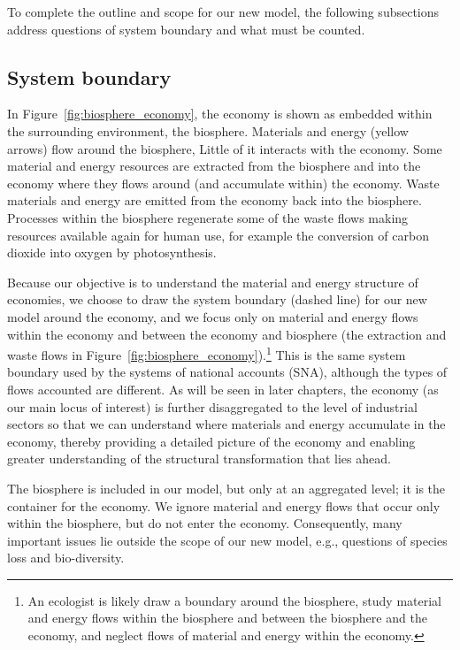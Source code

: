 To complete the outline and scope for our new model, 
the following subsections address
questions of system boundary and what must be counted.


\subsection{System boundary}
\label{sec:system_boundary}

In Figure~\ref{fig:biosphere_economy},
the economy is shown as embedded within the surrounding environment,
the biosphere.
Materials and energy (yellow arrows) flow around the biosphere,
Little of it interacts with the economy.
Some material and energy resources are extracted from the biosphere 
and into the economy where they 
flows around (and accumulate within) the economy.
Waste materials and energy are emitted from the economy back into the biosphere.
Processes within the biosphere regenerate some of the waste
flows making resources available again for human use,
for example the conversion of carbon dioxide into oxygen by photosynthesis.

Because our objective is to understand the material and energy structure of economies,
we choose to draw the system boundary (dashed line) for our new model 
around the economy, 
and we focus only on material and energy flows within the economy
and between the economy and biosphere (the extraction and waste flows 
in Figure~\ref{fig:biosphere_economy}).\footnote{An ecologist
	is likely draw a boundary around the biosphere, 
	study material and energy flows within the biosphere
	and between the biosphere and the economy, and 
	neglect flows of material and energy within the economy.
	}
This is the same system boundary used by the
systems of national accounts (SNA),
although the types of flows accounted are different.
As will be seen in later chapters,
the economy (as our main locus of interest) is further disaggregated 
to the level of industrial sectors
so that we can understand 
where materials and energy accumulate in the economy, thereby providing
a detailed picture of the economy and
enabling greater understanding of the structural transformation that lies ahead.

The biosphere is included in our model, but only at an aggregated level;
it is the container for the economy. 
We ignore material and energy flows that occur only within the biosphere,
but do not enter the economy.
Consequently, many important issues lie outside the scope of our new model, 
e.g., questions of species loss and
bio-diversity.

